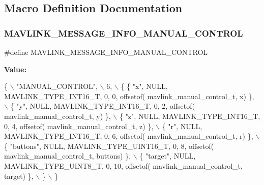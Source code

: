 \subsection{Macro Definition Documentation}
\mbox{\label{mavlink__msg__manual__control_8h_abe54cdb24f7f2b815f0bb96c8e99e7a4}} 
\subsubsection{M\+A\+V\+L\+I\+N\+K\+\_\+\+M\+E\+S\+S\+A\+G\+E\+\_\+\+I\+N\+F\+O\+\_\+\+M\+A\+N\+U\+A\+L\+\_\+\+C\+O\+N\+T\+R\+OL}
{\footnotesize\ttfamily \#define M\+A\+V\+L\+I\+N\+K\+\_\+\+M\+E\+S\+S\+A\+G\+E\+\_\+\+I\+N\+F\+O\+\_\+\+M\+A\+N\+U\+A\+L\+\_\+\+C\+O\+N\+T\+R\+OL}

{\bfseries Value\+:}
\begin{DoxyCode}
\{ \(\backslash\)
    \textcolor{stringliteral}{"MANUAL\_CONTROL"}, \(\backslash\)
    6, \(\backslash\)
    \{  \{ \textcolor{stringliteral}{"x"}, NULL, MAVLINK_TYPE_INT16_T, 0, 0, offsetof(
      mavlink_manual_control_t, x) \}, \(\backslash\)
         \{ \textcolor{stringliteral}{"y"}, NULL, MAVLINK_TYPE_INT16_T, 0, 2, offsetof(
      mavlink_manual_control_t, y) \}, \(\backslash\)
         \{ \textcolor{stringliteral}{"z"}, NULL, MAVLINK_TYPE_INT16_T, 0, 4, offsetof(
      mavlink_manual_control_t, z) \}, \(\backslash\)
         \{ \textcolor{stringliteral}{"r"}, NULL, MAVLINK_TYPE_INT16_T, 0, 6, offsetof(
      mavlink_manual_control_t, r) \}, \(\backslash\)
         \{ \textcolor{stringliteral}{"buttons"}, NULL, MAVLINK_TYPE_UINT16_T, 0, 8, offsetof(
      mavlink_manual_control_t, buttons) \}, \(\backslash\)
         \{ \textcolor{stringliteral}{"target"}, NULL, MAVLINK_TYPE_UINT8_T, 0, 10, offsetof(
      mavlink_manual_control_t, target) \}, \(\backslash\)
         \} \(\backslash\)
\}
\end{DoxyCode}
\mbox{\label{mavlink__msg__manual__control_8h_a299662fb7781e640d342c4d4518aa18d}} 

